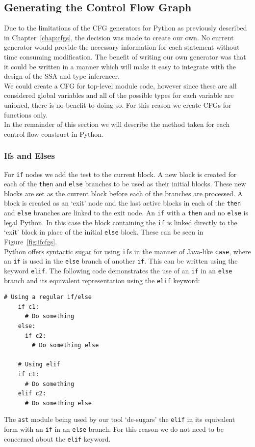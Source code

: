 \documentclass[12pt, titlepage]{article}
\begin{document}
\subsection{Generating the Control Flow Graph}
Due to the limitations of the CFG generators for Python as previously described in Chapter~\ref{chap:cfgs}, the decision was made to create our own. No current generator would provide the necessary information for each statement without time consuming modification. The benefit of writing our own generator was that it could be written in a manner which will make it easy to integrate with the design of the SSA and type inferencer. \\
\indent We could create a CFG for top-level module code, however since these are all considered global variables and all of the possible types for each variable are unioned, there is no benefit to doing so. For this reason we create CFGs for functions only. \\
\indent In the remainder of this section we will describe the method taken for each control flow construct in Python.

\subsubsection{Ifs and Elses}
For \texttt{if} nodes we add the test to the current block. A new block is created for each of the \texttt{then} and \texttt{else} branches to be used as their initial blocks. These new blocks are set as the current block before each of the branches are processed. A block is created as an `exit' node and the last active blocks in each of the \texttt{then} and \texttt{else} branches are linked to the exit node. An \texttt{if} with a \texttt{then} and no \texttt{else} is legal Python. In this case the block containing the \texttt{if} is linked directly to the `exit' block in place of the initial \texttt{else} block. These can be seen in Figure~\ref{fig:ifcfgs}. \\
\indent Python offers syntactic sugar for using \texttt{if}s in the manner of Java-like \texttt{case}, where an \texttt{if} is used in the \texttt{else} branch of another \texttt{if}. This can be written using the keyword \texttt{elif}. The following code demonstrates the use of an \texttt{if} in an \texttt{else} branch and its equivalent representation using the \texttt{elif} keyword:
\begin{lstlisting}[mathescape]
    # Using a regular if/else
    if c1:
      # Do something
    else:
      if c2:
        # Do something else
	   
    # Using elif 
    if c1:
      # Do something
    elif c2:
      # Do something else
\end{lstlisting}
The \texttt{ast} module being used by our tool `de-sugars' the \texttt{elif} in its equivalent form with an \texttt{if} in an \texttt{else} branch. For this reason we do not need to be concerned about the \texttt{elif} keyword.
\end{document}
